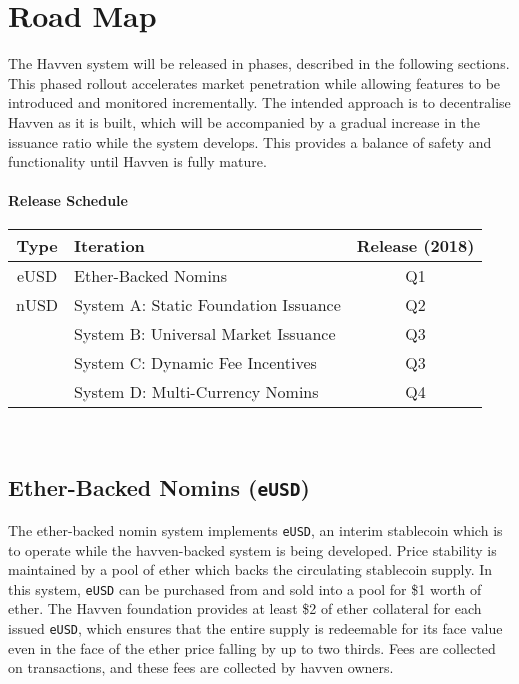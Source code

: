 \section{Road Map}

The Havven system will be released in phases, described in the following
sections. This phased rollout accelerates market penetration while
allowing features to be introduced and monitored incrementally. The intended approach  
is to decentralise Havven as it is built, which will be accompanied by a gradual
increase in the issuance ratio while the system develops.
This provides a balance of safety and functionality until Havven is fully
mature.

\paragraph{Release Schedule}
\renewcommand{\arraystretch}{1.5}
\setlength{\tabcolsep}{13pt}
\begin{centering}
    \begin{tabular}{|c|l|c|}
        \hline
        \textbf{Type} & \textbf{Iteration} & \textbf{Release (2018)} \\
        \hline
        \hline
        eUSD & Ether-Backed Nomins & Q1 \\
        \hline
        \hline
        nUSD & System A: Static Foundation Issuance & Q2 \\ \cline{2-3}
        & System B: Universal Market Issuance & Q3 \\ \cline{2-3}
        & System C: Dynamic Fee Incentives & Q3 \\ \cline{2-3}
        & System D: Multi-Currency Nomins& Q4 \\
        \hline
    \end{tabular} \\
\end{centering}
\vspace{0.5cm}

\subsection{Ether-Backed Nomins (\texttt{eUSD})}

\noindent The ether-backed nomin system implements \texttt{eUSD}, an interim stablecoin
which is to operate while the havven-backed system is being developed.
Price stability is maintained by a pool of ether which backs the circulating stablecoin
supply. In this system, \texttt{eUSD} can be purchased from and sold into a pool
for \$1 worth of ether. The Havven foundation provides at least \$2 of ether collateral
for each issued \texttt{eUSD}, which ensures that the entire supply is redeemable for its
face value even in the face of the ether price falling by up to two thirds. Fees are
collected on transactions, and these fees are collected by havven owners. \\

